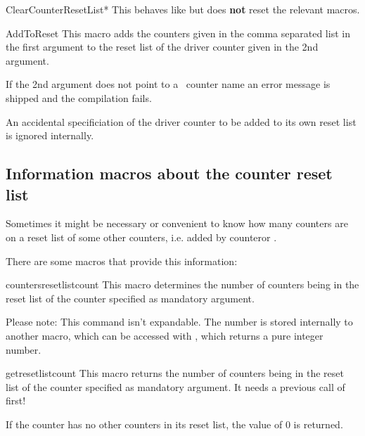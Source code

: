 \documentclass[12pt,a4paper,oneside]{article}
\makeatletter
\newcommand{\chdocextractversion}[1]{%
  \@nameuse{#1}%
}
\renewcommand{\tcbdocupdated}[1]{#1}%
\newcommand{\CHDocNew}[1]{%
  \tcbdocmarginnote[doclang/new={N},
  colframe=blue,
  halign=left,
  colback={blue!20!white},
  fontupper={\tiny}
  ]{%
    \chdocextractversion{xassoccntversion#1}%
  }%
}
\newcommand{\CHDocUpdate}[1]{\tcbdocmarginnote[doclang/updated={},colback={yellow},colframe={yellow!50!red},  fontupper={\tiny}
]{%
  \tcbdocupdated{\chdocextractversion{xassoccntversion#1}}%
}%
}
\makeatother
\begin{document}
\begin{docCommand}[before={\CHDocNew{1.4}}]{ClearCounterResetList*}{} 
    This behaves like  but does \textbf{not} reset the relevant  macros.
\end{docCommand}


\begin{docCommand}[before={\CHDocNew{1.0}\CHDocUpdate{1.4}}]{AddToReset}{}
This macro adds the counters given in the comma separated list in the first argument to the reset list of the driver counter given in the 2nd argument.

If the 2nd argument does not point to a \LaTeXe\ counter name an error message is shipped and the compilation fails. 

An accidental specificiation of the driver counter to be added to its own reset list is ignored internally. 
\end{docCommand}


\subsection[Information macros about the reset list]{Information macros about the counter reset list}

Sometimes it might be necessary or convenient to know how many counters are on a reset list of some other counters, i.e. added by \textbraceleft counter or . 

There are some macros that provide this information:

\begin{docCommand}{countersresetlistcount}{}
This macro determines the number of counters being in the reset list of the counter specified as mandatory argument. 

Please note: This command isn't expandable. The number is stored internally to another macro, which can be accessed with , which returns a pure integer number. 
\end{docCommand}

\begin{docCommand}{getresetlistcount}{}
This macro returns the number of counters being in the reset list of the counter specified as mandatory argument. It needs a previous call of  first!

If the counter has no other counters in its reset list, the value of 0 is returned. 
\end{docCommand}
\end{document}
